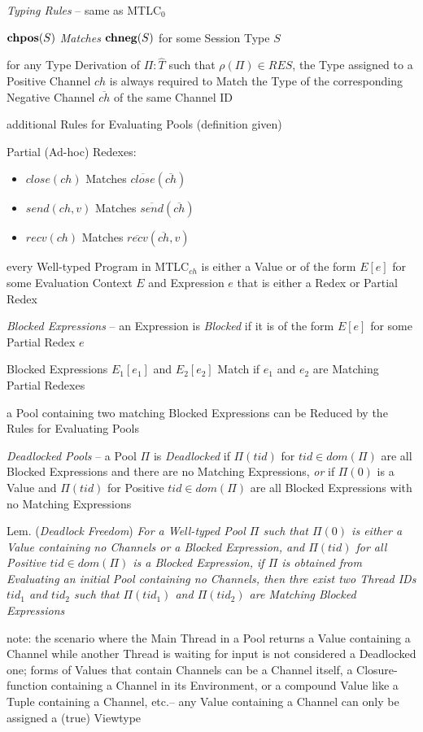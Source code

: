 \emph{Typing Rules} -- same as MTLC$_0$

$\mathbf{chpos}(S)$ \emph{Matches} $\mathbf{chneg}(S)$ for some Session Type $S$

for any Type Derivation of $\Pi : \hat{T}$ such that $\rho(\Pi) \in
RES$, the Type assigned to a Positive Channel $ch$ is always required
to Match the Type of the corresponding Negative Channel
$\overline{ch}$ of the same Channel ID

additional Rules for Evaluating Pools (definition given)

Partial (Ad-hoc) Redexes:
\begin{itemize}
  \item $close(ch)$ Matches $\overline{close}(\overline{ch})$
  \item $send(ch,v)$ Matches $\overline{send}(\overline{ch})$
  \item $recv(ch)$ Matches $\overline{recv}(\overline{ch},v)$
\end{itemize}

every Well-typed Program in MTLC$_{ch}$ is either a Value or of the
form $E[e]$ for some Evaluation Context $E$ and Expression $e$ that is
either a Redex or Partial Redex

\emph{Blocked Expressions} -- an Expression is \emph{Blocked} if it is
of the form $E[e]$ for some Partial Redex $e$

Blocked Expressions $E_1[e_1]$ and $E_2[e_2]$ Match if $e_1$ and $e_2$
are Matching Partial Redexes

a Pool containing two matching Blocked Expressions can be Reduced
by the Rules for Evaluating Pools

\emph{Deadlocked Pools} -- a Pool $\Pi$ is \emph{Deadlocked} if
$\Pi(tid)$ for $tid \in dom(\Pi)$ are all Blocked Expressions and
there are no Matching Expressions, \emph{or} if $\Pi(0)$ is a Value
and $\Pi(tid)$ for Positive $tid \in dom(\Pi)$ are all Blocked
Expressions with no Matching Expressions

Lem. (\emph{Deadlock Freedom}) \emph{For a Well-typed Pool $\Pi$ such
  that $\Pi(0)$ is either a Value containing no Channels or a Blocked
  Expression, and $\Pi(tid)$ for all Positive $tid \in dom(\Pi)$ is a
  Blocked Expression, if $\Pi$ is obtained from Evaluating an initial
  Pool containing no Channels, then thre exist two Thread IDs $tid_1$
  and $tid_2$ such that $\Pi(tid_1)$ and $\Pi(tid_2)$ are Matching
  Blocked Expressions}

note: the scenario where the Main Thread in a Pool returns a Value
containing a Channel while another Thread is waiting for input is not
considered a Deadlocked one; forms of Values that contain Channels can
be a Channel itself, a Closure-function containing a Channel in its
Environment, or a compound Value like a Tuple containing a Channel,
etc.-- any Value containing a Channel can only be assigned a (true)
Viewtype

